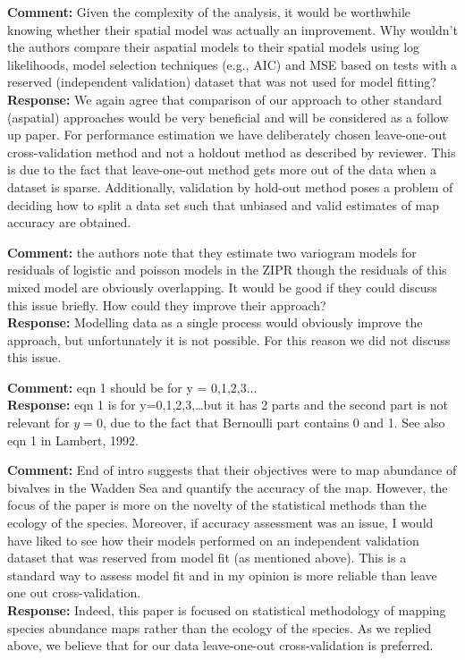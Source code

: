 \documentclass{letter}
\begin{document}
\begin{letter}
\textbf{Comment:} 
Given the complexity of the analysis, it would be worthwhile knowing whether their spatial model was actually an improvement. Why wouldn't the authors compare their aspatial models to their spatial models using log likelihoods, model selection techniques (e.g., AIC) and MSE based on tests with a reserved (independent validation) dataset that was not used for model fitting? \\
\textbf{Response:} We again agree that comparison of our approach to other standard (aspatial) approaches would be very beneficial and will be considered as a follow up paper. For performance estimation we have deliberately chosen leave-one-out cross-validation method and not a holdout method as described by reviewer. This is due to the fact that leave-one-out method 
gets more out of the data when a dataset is sparse.  Additionally,  validation by hold-out method poses a problem of deciding how to split a data set such that unbiased  and  valid  estimates of  map  accuracy  are  obtained.

\textbf{Comment:} 
the authors note that they estimate two variogram models for residuals of logistic and poisson models in the ZIPR though the residuals of this mixed model are obviously overlapping. It would be good if they could discuss this issue briefly. How could they improve their approach?\\
\textbf{Response:} Modelling data as a single process would obviously improve the approach, but unfortunately it is not possible. For this reason we did not discuss this issue.  

\textbf{Comment:} 
eqn 1 should be for y = 0,1,2,3...\\
\textbf{Response:} 
eqn 1 is for y=0,1,2,3,\ldots but it has 2 parts and the second part is not relevant for $y=0$, due to the fact that Bernoulli part contains 0 and 1. See also eqn 1 in Lambert, 1992.

\textbf{Comment:} 
End of intro suggests that their objectives were to map abundance of bivalves in the Wadden Sea and quantify the accuracy of the map. However, the focus of the paper is more on the novelty of the statistical methods than the ecology of the species. Moreover, if accuracy assessment was an issue, I would have liked to see how their models performed on an independent validation dataset that was reserved from model fit (as mentioned above). This is a standard way to assess model fit and in my opinion is more reliable than leave one out cross-validation. \\
\textbf{Response:} Indeed, this paper is focused on statistical methodology of mapping species abundance maps rather than the ecology of the species. As we replied above, we believe that for our data leave-one-out cross-validation is preferred. 


\end{letter}
\end{document}
